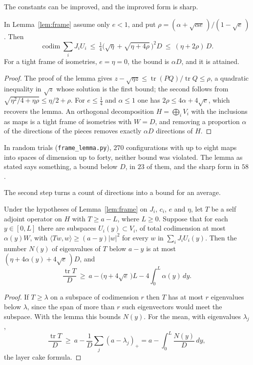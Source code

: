 The constants can be improved, and the improved form is sharp.

\begin{proposition}\label{prop:framesharp}
In Lemma~\ref{lem:frame} assume only $e<1$, and put $\rho=(\alpha+\sqrt{\alpha e}\,)/(1-\sqrt e\,)$. Then
\[
\operatorname{codim}\sum_iJ_iU_i\ \le\ \tfrac14\Big(\sqrt\eta+\sqrt{\eta+4\rho}\,\Big)^2D\ \le\ (\eta+2\rho)\,D.
\]
For a tight frame of isometries, $e=\eta=0$, the bound is $\alpha D$, and it is attained.
\end{proposition}

\begin{proof}
The proof of the lemma gives $z-\sqrt{\eta z}\le\operatorname{tr}(PQ)/\operatorname{tr}Q\le\rho$, a quadratic inequality in $\sqrt z$ whose solution is the first bound; the second follows from $\sqrt{\eta^2/4+\eta\rho}\le\eta/2+\rho$. For $e\le\frac14$ and $\alpha\le1$ one has $2\rho\le4\alpha+4\sqrt e$, which recovers the lemma. An orthogonal decomposition $H=\bigoplus_iV_i$ with the inclusions as maps is a tight frame of isometries with $W=D$, and removing a proportion $\alpha$ of the directions of the pieces removes exactly $\alpha D$ directions of $H$.
\end{proof}

In random trials (\texttt{frame\_lemma.py}), $270$ configurations with up to eight maps into spaces of dimension up to forty, neither bound was violated. The lemma as stated says something, a bound below $D$, in $23$ of them, and the sharp form in $58$.

The second step turns a count of directions into a bound for an average.

\begin{corollary}\label{cor:lowstates}
Under the hypotheses of Lemma~\ref{lem:frame} on $J_i$, $c_i$, $e$ and $\eta$, let $T$ be a self adjoint operator on $H$ with $T\ge a-L$, where $L\ge0$. Suppose that for each $y\in[0,L]$ there are subspaces $U_i(y)\subset V_i$, of total codimension at most $\alpha(y)W$, with $\langle Tw,w\rangle\ge(a-y)|w|^2$ for every $w$ in $\sum_iJ_iU_i(y)$. Then the number $N(y)$ of eigenvalues of $T$ below $a-y$ is at most $(\eta+4\alpha(y)+4\sqrt e\,)D$, and
\[
\frac{\operatorname{tr}T}{D}\ \ge\ a-\big(\eta+4\sqrt e\,\big)L-4\int_0^L\alpha(y)\,dy.
\]
\end{corollary}

\begin{proof}
If $T\ge\lambda$ on a subspace of codimension $r$ then $T$ has at most $r$ eigenvalues below $\lambda$, since the span of more than $r$ such eigenvectors would meet the subspace. With the lemma this bounds $N(y)$. For the mean, with eigenvalues $\lambda_j$,
\[
\frac{\operatorname{tr}T}{D}\ \ge\ a-\frac1D\sum_j(a-\lambda_j)_+=a-\int_0^L\frac{N(y)}{D}\,dy,
\]
the layer cake formula.
\end{proof}

